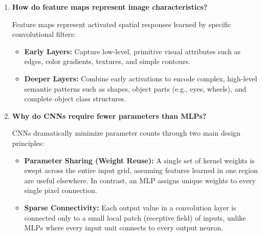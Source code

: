 \documentclass[11pt]{article}
\begin{document}
\begin{enumerate}
    Pooling (e.g., Max or Average Pooling) acts as a spatial downsampling step. Key benefits include:
    \begin{itemize}
        \item \textbf{Dimensionality Reduction:} Shrinks feature map dimensions, significantly lowering computational load and parameter counts in subsequent layers.
        \item \textbf{Translation Invariance:} Makes representations robust to minor shifts, distortions, or translations of input features.
        \item \textbf{Receptive Field Expansion:} Increases the effective field of view for deeper layers, allowing them to capture higher-level abstract features.
    \end{itemize}

    \item \textbf{How do feature maps represent image characteristics?}
    
    Feature maps represent activated spatial responses learned by specific convolutional filters:
    \begin{itemize}
        \item \textbf{Early Layers:} Capture low-level, primitive visual attributes such as edges, color gradients, textures, and simple contours.
        \item \textbf{Deeper Layers:} Combine early activations to encode complex, high-level semantic patterns such as shapes, object parts (e.g., eyes, wheels), and complete object class structures.
    \end{itemize}

    \item \textbf{Why do CNNs require fewer parameters than MLPs?}
    
    CNNs dramatically minimize parameter counts through two main design principles:
    \begin{itemize}
        \item \textbf{Parameter Sharing (Weight Reuse):} A single set of kernel weights is swept across the entire input grid, assuming features learned in one region are useful elsewhere. In contrast, an MLP assigns unique weights to every single pixel connection.
        \item \textbf{Sparse Connectivity:} Each output value in a convolution layer is connected only to a small local patch (receptive field) of inputs, unlike MLPs where every input unit connects to every output neuron.
    \end{itemize}
\end{enumerate}
\end{document}
